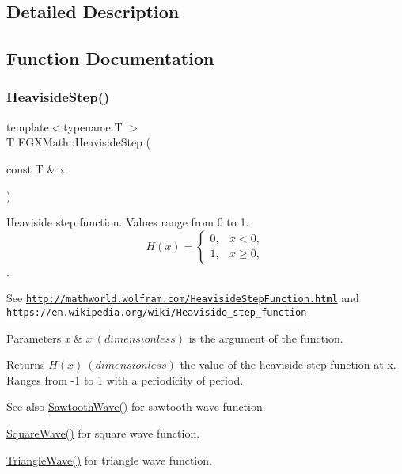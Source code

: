 \subsection{Detailed Description}


\subsection{Function Documentation}
\mbox{\label{group___e_g_x_math-_functions-_periodic_ga0fb325d5423606e9c222e1ebd6a65833}} 
\subsubsection{\texorpdfstring{Heaviside\+Step()}{HeavisideStep()}}
{\footnotesize\ttfamily template$<$typename T $>$ \\
T E\+G\+X\+Math\+::\+Heaviside\+Step (\begin{DoxyParamCaption}\item[{const T \&}]{x }\end{DoxyParamCaption})}



Heaviside step function. Values range from 0 to 1. \[H(x)=\begin{cases} 0, & x < 0, \\ 1, & x \ge 0, \end{cases} \]. 

See \href{http://mathworld.wolfram.com/HeavisideStepFunction.html}{\tt http\+://mathworld.\+wolfram.\+com/\+Heaviside\+Step\+Function.\+html} and \href{https://en.wikipedia.org/wiki/Heaviside_step_function}{\tt https\+://en.\+wikipedia.\+org/wiki/\+Heaviside\+\_\+step\+\_\+function} 
\begin{DoxyParams}{Parameters}
{\em x} & $x\ (dimensionless)$ is the argument of the function. \\
\hline
\end{DoxyParams}
\begin{DoxyReturn}{Returns}
$H(x)\ (dimensionless)$ the value of the heaviside step function at x. Ranges from -\/1 to 1 with a periodicity of period. 
\end{DoxyReturn}
\begin{DoxySeeAlso}{See also}
\mbox{\hyperlink{group___e_g_x_math-_functions-_periodic_ga3eab4a0455f64881f9c183987682d85c}{Sawtooth\+Wave()}} for sawtooth wave function. 

\mbox{\hyperlink{group___e_g_x_math-_functions-_periodic_ga3bdc6c02d347f48f91bca886448db33a}{Square\+Wave()}} for square wave function. 

\mbox{\hyperlink{group___e_g_x_math-_functions-_periodic_gafa81ebd66ef7cd080370fad972d6ac50}{Triangle\+Wave()}} for triangle wave function. 
\end{DoxySeeAlso}
\mbox{\label{group___e_g_x_math-_functions-_periodic_ga3eab4a0455f64881f9c183987682d85c}} 
